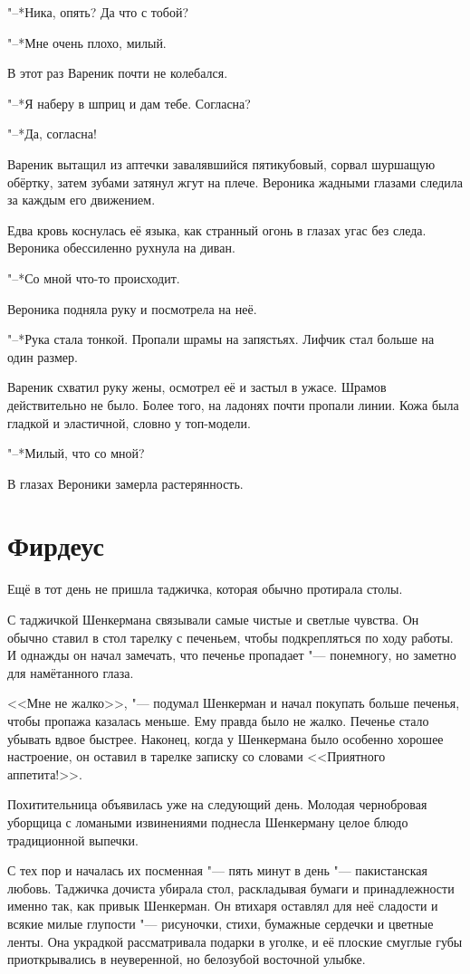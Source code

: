 "--*Ника, опять?
Да что с тобой?

"--*Мне очень плохо, милый.

В этот раз Вареник почти не колебался.

"--*Я наберу в шприц и дам тебе.
Согласна?

"--*Да, согласна!

Вареник вытащил из аптечки завалявшийся пятикубовый, сорвал шуршащую обёртку, затем зубами затянул жгут на плече.
Вероника жадными глазами следила за каждым его движением.

Едва кровь коснулась её языка, как странный огонь в глазах угас без следа.
Вероника обессиленно рухнула на диван.

"--*Со мной что-то происходит.

Вероника подняла руку и посмотрела на неё.

"--*Рука стала тонкой.
Пропали шрамы на запястьях.
Лифчик стал больше на один размер.

Вареник схватил руку жены, осмотрел её и застыл в ужасе.
Шрамов действительно не было.
Более того, на ладонях почти пропали линии.
Кожа была гладкой и эластичной, словно у топ-модели.

"--*Милый, что со мной?

В глазах Вероники замерла растерянность.

\section{Фирдеус}

Ещё в тот день не пришла таджичка, которая обычно протирала столы.

С таджичкой Шенкермана связывали самые чистые и светлые чувства.
Он обычно ставил в стол тарелку с печеньем, чтобы подкрепляться по ходу работы.
И однажды он начал замечать, что печенье пропадает "--- понемногу, но заметно для намётанного глаза.

<<Мне не жалко>>, "--- подумал Шенкерман и начал покупать больше печенья, чтобы пропажа казалась меньше.
Ему правда было не жалко.
Печенье стало убывать вдвое быстрее.
Наконец, когда у Шенкермана было особенно хорошее настроение, он оставил в тарелке записку со словами <<Приятного аппетита!>>.

Похитительница объявилась уже на следующий день.
Молодая чернобровая уборщица с ломаными извинениями поднесла Шенкерману целое блюдо традиционной выпечки.

С тех пор и началась их посменная "--- пять минут в день "--- пакистанская любовь.
Таджичка дочиста убирала стол, раскладывая бумаги и принадлежности именно так, как привык Шенкерман.
Он втихаря оставлял для неё сладости и всякие милые глупости "--- рисуночки, стихи, бумажные сердечки и цветные ленты.
Она украдкой рассматривала подарки в уголке, и её плоские смуглые губы приоткрывались в неуверенной, но белозубой восточной улыбке.


